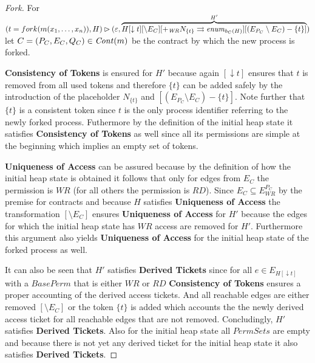 	\begin{proof}[Fork]
		For\\[-\baselineskip] $(t = fork(m(x_{1},\dots,x_{n})), H)\rhd
		(\varepsilon, \overbrace{H[\downarrow t][\setminus E_{C}]
		[+_{\mathit{WR}}N_{\{t\}}\rightrightarrows
		\mathit{enum}_{b_{C}(H)}][(E_{P_{C}}\setminus E_{C})-\{t\}]}^{H'})$
		let $C = (P_{C}, E_{C}, Q_{C})\in\mathit{Cont}(m)$ be the contract by which the
		new process is forked.
		
		\textbf{Consistency of Tokens} is ensured for
		$H'$ because again $[\downarrow t]$ ensures that $t$ is removed from all
		used tokens and therefore $\{t\}$ can be added safely by the introduction
		of the placeholder $N_{\{t\}}$ and $[(E_{P_{C}}\setminus E_{C})-\{t\}]$.
		Note further that $\{t\}$ is a consistent token since $t$ is the only
		process identifier referring to the newly forked process. Futhermore by
		the definition of the initial heap state it satisfies \textbf{Consistency
		of Tokens} as well since all its permissions are simple at the
		beginning which implies an empty set of tokens.

		\textbf{Uniqueness of Access} can be assured because by the
		definition of how the initial heap state is obtained it follows that only
		for edges from $E_{C}$ the permission is $\mathit{WR}$ (for all others
		the permission is $\mathit{RD}$). Since
		$E_{C}\subseteq E^{P_{C}}_{\mathit{WR}}$ by the
		premise for contracts and because $H$ satisfies
		\textbf{Uniqueness of Access} the transformation $[\setminus E_{C}]$
		ensures \textbf{Uniqueness of Access} for $H'$ because the edges for
		which the initial heap state has $\mathit{WR}$ access are removed for
		$H'$. Furthermore this argument also yields \textbf{Uniqueness of Access}
		for the initial heap state of the forked process as well.

		It can also be seen that $H'$ satisfies \textbf{Derived Tickets} since
		for all $e\in E_{H[\downarrow t]}$ with a $\mathit{BasePerm}$ that is
		either $\mathit{WR}$ or $\mathit{RD}$ \textbf{Consistency of Tokens}
		ensures a proper accounting of the derived access tickets. And
		all reachable edges are either removed $[\setminus E_{C}]$ or the token
		$\{t\}$ is added which accounts the the newly derived access ticket for
		all reachable edges that are not removed.
		Concludingly, $H'$ satisfies \textbf{Derived Tickets}. Also for the
		initial heap state all $\mathit{PermSets}$ are empty and because there
		is not yet any derived ticket for the initial heap state it also
		satisfies \textbf{Derived Tickets}.
	\end{proof}

